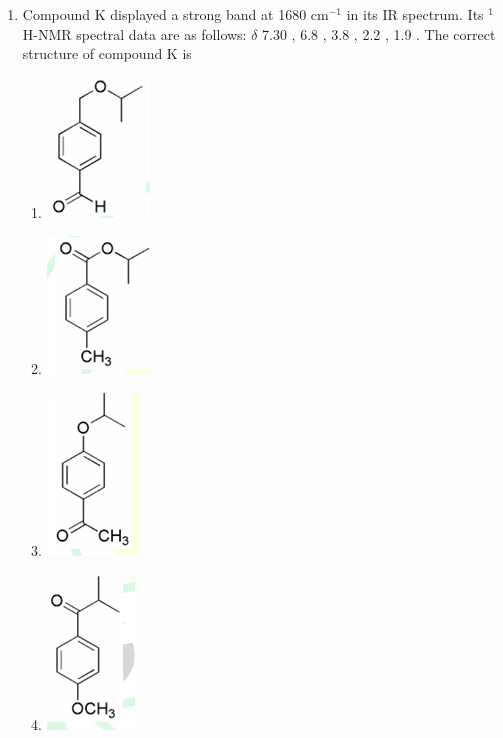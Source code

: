 \documentclass[journal,12pt,onecolumn]{IEEEtran}
\theoremstyle{remark}
\begin{document}
\begin{enumerate}
\item Compound K displayed a strong band at 1680 cm$^{-1}$ in its IR spectrum. Its $^{1}$H-NMR spectral data are as follows: $\delta$  7.30 , 6.8 , 3.8 , 2.2 , 1.9 . The correct structure of compound K is
 \begin{multicols}{2}
    \begin{enumerate}
        \item \includegraphics[width=0.25\columnwidth]{figs/q42a.png}
        \item \includegraphics[width=0.25\columnwidth]{figs/q42b.png}
        \item \includegraphics[width=0.25\columnwidth]{figs/q42c.png}
        \item \includegraphics[width=0.25\columnwidth]{figs/q42d.png}
    \end{enumerate}      \hfill{}
    \end{multicols}




\end{enumerate}
\end{document}

